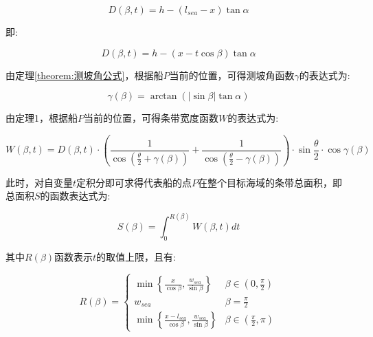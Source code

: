 \begin{equation*}
    D(\beta, t) = 
    h - \left(l_{sea} - x\right)\tan \alpha
\end{equation*}

即:

\begin{equation}
    D(\beta, t) = 
    h - \left(x - t\cos \beta \right)\tan \alpha
\end{equation}

由定理\ref{theorem:测坡角公式}，根据船$P$当前的位置，可得测坡角函数$\gamma$的表达式为:

\begin{equation}
    \gamma(\beta) = 
    \arctan \left(|\sin \beta| \tan \alpha\right)
\end{equation}

由定理1，根据船$P$当前的位置，可得条带宽度函数$W$的表达式为:

\begin{equation}
    W(\beta, t) = 
    D(\beta, t)\cdot 
    \left(
        \frac{1}{\cos (\frac{\theta}{2} + \gamma(\beta))} +
        \frac{1}{\cos (\frac{\theta}{2} - \gamma(\beta))}
    \right)\cdot
    \sin {\frac{\theta}{2}}\cdot \cos \gamma(\beta)
\end{equation}

此时，对自变量$t$定积分即可求得代表船的点$P$在整个目标海域的条带总面积，即总面积$S$的函数表达式为:

\begin{equation}
    S(\beta) = 
    \int _{0} ^{R(\beta)} {
        W(\beta, t)dt
    }
\end{equation}

其中$R(\beta)$函数表示$t$的取值上限，且有:

\begin{equation}
    R(\beta) = 
    \begin{cases}
        \min \left \{
                \frac{x}{\cos \beta}, 
                \frac{w_{sea}}{\sin \beta}
            \right \}
        & \beta \in \left(0, \frac{\pi}{2} \right)\\
        w_{sea} & \beta = \frac{\pi}{2}\\
        \min \left \{
                \frac{x - l_{sea}}{\cos \beta}, 
                \frac{w_{sea}}{\sin \beta}
            \right \}
        & \beta \in \left(\frac{\pi}{2}, \pi \right) 
    \end{cases}
\end{equation}

